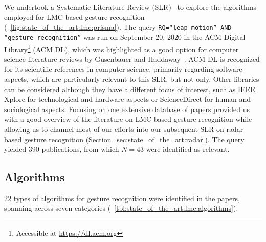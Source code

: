 We undertook a Systematic Literature Review (SLR)~\cite{Kitchenham:2010} to explore the algorithms employed for LMC-based gesture recognition (\fig~\ref{fig:state_of_the_art:lmc:prisma}). 
%
The query \texttt{RQ=``leap motion'' AND ``gesture recognition''} was run on September 20, 2020 in the ACM Digital Library\footnote{Accessible at \url{https://dl.acm.org}} (ACM DL), which was highlighted as a good option for computer science literature reviews by Gusenbauer and Haddaway~\cite{Gusenbauer:2020}. ACM DL is recognized for its scientific references in computer science, primarily regarding software aspects, which are particularly relevant to this SLR, but not only. Other libraries can be considered although they have a different focus of interest, such as IEEE Xplore for technological and hardware aspects or ScienceDirect for human and sociological aspects. Focusing on one extensive database of papers provided us with a good overview of the literature on LMC-based gesture recognition while allowing us to channel most of our efforts into our subsequent SLR on radar-based gesture recognition (Section~\ref{sec:state_of_the_art:radar}).
%
The query yielded 390 publications, from which $N{=}43$ were identified as relevant. 

\subsection{Algorithms} \label{sec:state_of_the_art:lmc:algorithms}
22 types of algorithms for gesture recognition were identified in the papers, spanning across seven categories (\tab~\ref{tbl:state_of_the_art:lmc:algorithms}).

